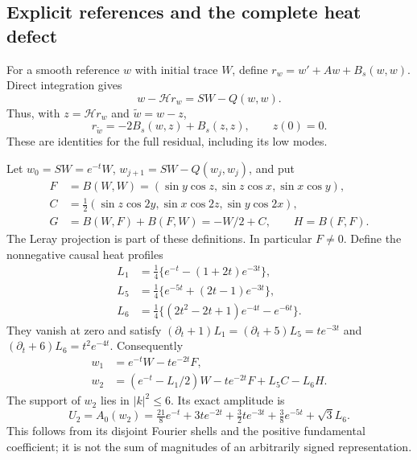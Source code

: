 \subsection{Explicit references and the complete heat defect}
\label{main:reference}

For a smooth reference $w$ with initial trace $W$, define
$r_w=w'+Aw+B_s(w,w)$. Direct integration gives
\begin{equation}
 w-\mathcal H r_w=SW-Q(w,w).\label{main:correction-map}
\end{equation}
Thus, with $z=\mathcal H r_w$ and $\widetilde w=w-z$,
\begin{equation}
 r_{\widetilde w}=-2B_s(w,z)+B_s(z,z),\qquad z(0)=0.
 \label{main:correction-residual}
\end{equation}
These are identities for the full residual, including its low modes.

Let $w_0=SW=e^{-t}W$, $w_{j+1}=SW-Q(w_j,w_j)$, and put
\begin{align}
 F&=B(W,W)=(\sin y\cos z,\sin z\cos x,\sin x\cos y),\nonumber\\
 C&=\tfrac12(\sin z\cos2y,\sin x\cos2z,\sin y\cos2x),\nonumber\\
 G&=B(W,F)+B(F,W)=-W/2+C,\qquad H=B(F,F).\label{main:fields}
\end{align}
The Leray projection is part of these definitions. In particular $F\ne0$.
Define the nonnegative causal heat profiles
\begin{align}
 L_1&=\tfrac14\{e^{-t}-(1+2t)e^{-3t}\},\nonumber\\
 L_5&=\tfrac14\{e^{-5t}+(2t-1)e^{-3t}\},\nonumber\\
 L_6&=\tfrac14\{(2t^2-2t+1)e^{-4t}-e^{-6t}\}.\label{main:L}
\end{align}
They vanish at zero and satisfy
$(\partial_t+1)L_1=(\partial_t+5)L_5=te^{-3t}$ and
$(\partial_t+6)L_6=t^2e^{-4t}$. Consequently
\begin{align}
 w_1&=e^{-t}W-te^{-2t}F,\nonumber\\
 w_2&=(e^{-t}-L_1/2)W-te^{-2t}F+L_5C-L_6H.\label{main:w2}
\end{align}
The support of $w_2$ lies in $|k|^2\le6$. Its exact amplitude is
\begin{equation}
 U_2=A_0(w_2)=\tfrac{21}{8}e^{-t}+3te^{-2t}
                 +\tfrac32te^{-3t}+\tfrac38e^{-5t}+\sqrt3L_6.
 \label{main:U2}
\end{equation}
This follows from its disjoint Fourier shells and the positive fundamental
coefficient; it is not the sum of magnitudes of an arbitrarily signed
representation.

